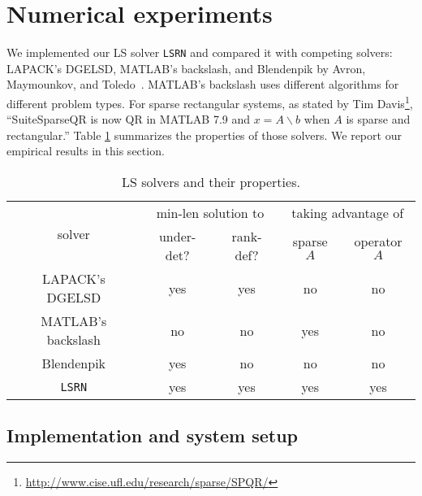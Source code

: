 \documentclass{siamltex}
\begin{document}
\section{Numerical experiments}
\label{sec:experiments}

We implemented our LS solver \texttt{LSRN} and compared it with
competing solvers: LAPACK's DGELSD, MATLAB's backslash, and Blendenpik by Avron,
Maymounkov, and Toledo~\cite{avron2010blendenpik}.  MATLAB's backslash uses
different algorithms for different problem types. For sparse rectangular
systems, as stated by Tim
Davis\footnote{\url{http://www.cise.ufl.edu/research/sparse/SPQR/}},
``SuiteSparseQR \cite{davis2006direct,davis2008algorithm} is now QR in MATLAB
7.9 and $x=A \backslash b$ when $A$ is sparse and rectangular.''  Table
\ref{tab:lsq_solvers} summarizes the properties of those solvers.  We report our
empirical results in this section.

\begin{table}
  \centering
  \caption{LS solvers and their properties.}
  \begin{tabular}{c|c|c|c|c}
    \multirow{2}{*}{solver} & \multicolumn{2}{|c|}{min-len solution to} & \multicolumn{2}{|c}{taking advantage of} \\ 
    & under-det? & rank-def? & sparse $A$ & operator $A$ \\
    \hline
    LAPACK's DGELSD & yes & yes & no & no \\
    MATLAB's backslash & no & no & yes &  no \\
    Blendenpik & yes & no & no & no \\
    \texttt{LSRN} & yes & yes & yes & yes 
  \end{tabular}
  \label{tab:lsq_solvers}
\end{table}

\subsection{Implementation and system setup}
\end{document}
